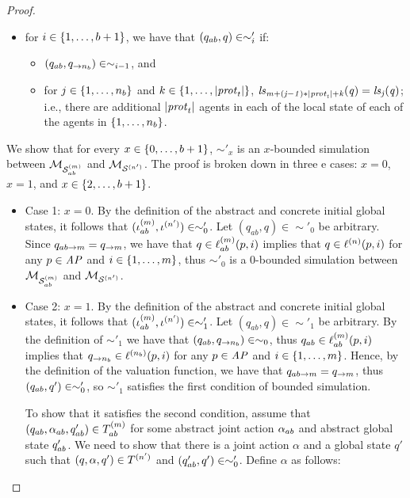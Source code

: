 \documentclass{article}
\begin{document}
\begin{proof}
\begin{itemize}
  \item for $i \in \left \{ 1, \ldots, b + 1 \right \}$, we have that $(q_{ab}, q) \in
  \sim'_i$ if:
  \begin{itemize}
    \item  $(q_{ab},q_{\rightarrow n_b}) \in \sim_{i-1}$, and 
    \item  for $j \in \left \{ 1,\ldots,n_b \right \}$ and $k \in \left \{ 1,\ldots,|\mathit{prot}_{t}| \right \}$, 
    $\it{ls}_{m + (j - 1) * |\mathit{prot}_{t}| + k}(q) = \it{ls}_{j}(q)$; i.e., there are
          additional $|\mathit{prot}_{t}|$  agents in each of the local state of each of
          the agents in $\left \{ 1,\ldots,n_b \right \}$.
  \end{itemize}
\end{itemize}

We show that for every $x \in \left \{ 0, \ldots, b+1 \right \}$, $\sim'_x$ is an
    $x$-bounded simulation between $\mathcal{M}_{\mathcal{S}_{ab}^{(m)}}$ and $\mathcal{M}_{\mathcal{S}^{(n')}}$.
    The proof is
    broken down in three e cases: $x=0$, $x=1$, and $x \in \left \{ 2,\ldots,b+1 \right \}$.
    
\begin{itemize}
  \item Case 1: $x=0$. By the definition of the abstract and concrete initial
      global states, it follows that $(\iota^{({m})}_{ab}, \iota^{({n'})}) \in
        \sim'_0$. Let $(q_{ab}, q) \in \sim'_0$ be arbitrary. Since  $q_{ab
        \rightarrow m} = q_{\rightarrow m}$, we have that $q \in \ell^{(m)}_{ab}(p, i)$ implies that $q \in \ell^{(n)} (p, i)$ for any $p \in
        \it{AP}$ and $i \in \left \{ 1,\ldots,m \right \}$, thus $\sim'_0$ is a $0$-bounded
        simulation between $\mathcal{M}_{\mathcal{S}_{ab}^{(m)}}$ and $\mathcal{M}_{\mathcal{S}^{(n')}}$.


  \item Case 2: $x = 1$.   By the definition of the abstract and concrete initial
      global states, it follows that $(\iota^{({m})}_{ab}, \iota^{({n'})}) \in
        \sim'_1$. Let $(q_{ab}, q) \in \sim'_1$ be arbitrary. 
      By the definition of $\sim'_1$ we have that
        $(q_{ab}, q_{\rightarrow n_b}) \in \sim_{0}$, thus  $q_{ab} \in \ell^{(m)}_{ab}(p, i)$ implies that $q_{\rightarrow n_b} \in \ell^{(n_b)} (p, i)$ for
        any $p \in \it{AP}$ and $i \in \left \{ 1,\ldots,m \right \}$. Hence, by the
        definition of the valuation function, we have that $q_{ab \rightarrow
        m} = q_{\rightarrow m}$, thus $(q_{ab}, q') \in \sim'_0$, so
        $\sim'_1$ satisfies the first condition of bounded simulation. 


  To show that it satisfies the second condition, assume that $(q_{ab},
  \alpha_{ab}, q_{ab}') \in T^{(m)}_{ab}$ for some abstract joint action
  $\alpha_{ab}$ and abstract global state $q_{ab}'$. We need to show that there
  is a joint action $\alpha$ and a  global state $q'$ such that $(q, \alpha, q')
  \in T^{(n')}$ and $(q_{ab}', q') \in \sim'_0$. Define $\alpha$ as
  follows:


\end{itemize}
\end{proof}
\end{document}
